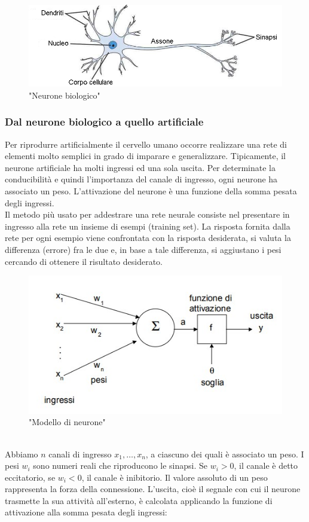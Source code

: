 \documentclass[a4paper,11pt]{article}
\begin{document}
    \begin{figure}[h]
        \centering
        \includegraphics[scale=0.7]{cervello.jpg}
        \caption{"Neurone biologico"}
    \end{figure}

    \subsubsection{Dal neurone biologico a quello artificiale}
    
    Per riprodurre artificialmente il cervello umano occorre realizzare
    una rete di elementi molto semplici in grado di imparare e generalizzare.
    Tipicamente, il neurone artificiale ha molti ingressi ed una sola uscita.
    Per determinate la conducibilità e quindi l'importanza del canale di ingresso, ogni neurone ha associato un peso. 
    L’attivazione del neurone è una funzione della somma pesata degli ingressi.\\[1in]
    Il metodo più usato per addestrare una rete neurale consiste nel presentare
    in ingresso alla rete un insieme di esempi (training set). 
    La risposta fornita dalla rete per ogni esempio viene confrontata con la risposta desiderata, si
    valuta la differenza (errore) fra le due e, in base a tale differenza, si
    aggiustano i pesi cercando di ottenere il risultato desiderato.
    \begin{figure}[h]
        \centering
        \includegraphics{neurone.jpg}
        \caption{"Modello di neurone"}
    \end{figure}
    \\Abbiamo $n$ canali di ingresso $x_1, …, x_n$, a ciascuno dei quali è associato un peso. 
    I pesi $w_i$ sono numeri reali che riproducono le sinapsi. Se $w_i > 0$, il canale è detto eccitatorio, se $w_i < 0$, il canale è inibitorio. 
    Il valore assoluto di un peso rappresenta la forza della connessione. 
    L’uscita, cioè il segnale con cui il neurone trasmette la sua attività
    all’esterno, è calcolata applicando la funzione di attivazione alla somma
    pesata degli ingressi:
    
\end{document}
